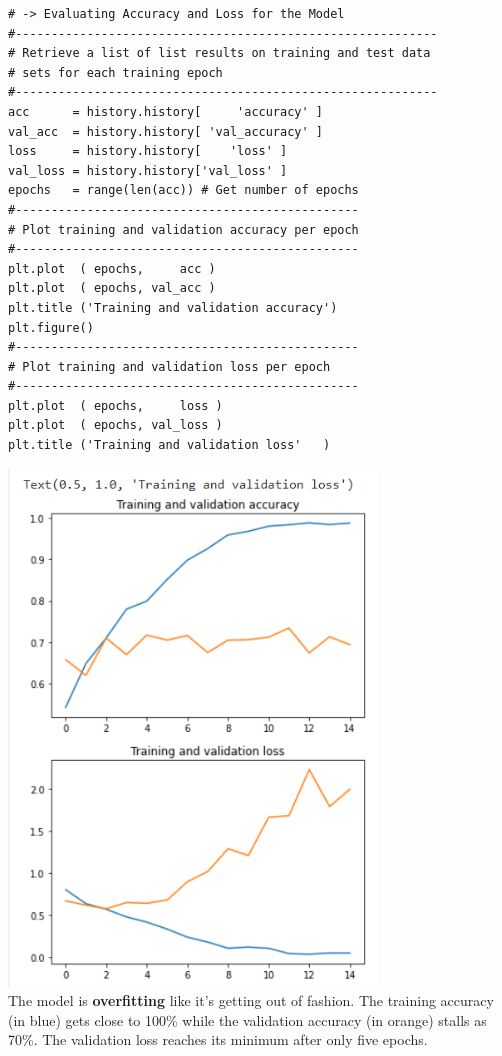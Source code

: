 \documentclass[20pt]{article}
\begin{document}
\begin{itemize}
\begin{verbatim}
# -> Evaluating Accuracy and Loss for the Model
#-----------------------------------------------------------
# Retrieve a list of list results on training and test data
# sets for each training epoch
#-----------------------------------------------------------
acc      = history.history[     'accuracy' ]
val_acc  = history.history[ 'val_accuracy' ]
loss     = history.history[    'loss' ]
val_loss = history.history['val_loss' ]
epochs   = range(len(acc)) # Get number of epochs
#------------------------------------------------
# Plot training and validation accuracy per epoch
#------------------------------------------------
plt.plot  ( epochs,     acc )
plt.plot  ( epochs, val_acc )
plt.title ('Training and validation accuracy')
plt.figure()
#------------------------------------------------
# Plot training and validation loss per epoch
#------------------------------------------------
plt.plot  ( epochs,     loss )
plt.plot  ( epochs, val_loss )
plt.title ('Training and validation loss'   )
		\end{verbatim}
		\includegraphics{overfittingCatsDogs.png}
		\\
		The model is \textbf{overfitting} like it's getting out of fashion. The training accuracy (in blue) gets close to 100\% while the validation accuracy (in orange) stalls as 70\%. The validation loss reaches its minimum after only five epochs.\\

\end{itemize}
\end{document}
